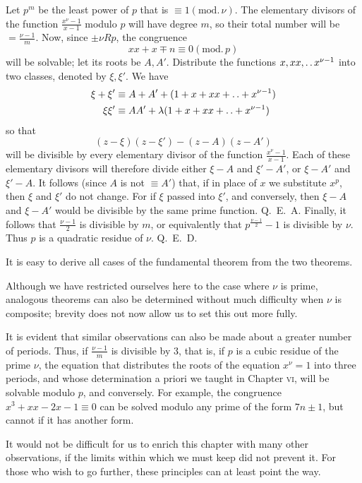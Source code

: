 Let $p^m$ be the least power of $p$ that is $\equiv1(\mathrm{mod.}\,\nu)$. The elementary divisors of the function $\frac{x^\nu-1}{x-1}$ modulo $p$ will have degree $m$, so their total number will be $=\frac{\nu-1}m$. Now, since $\pm\nu Rp$, the congruence
\[
xx+x\mp n\equiv0(\mathrm{mod.}\,p)
\]
will be solvable; let its roots be $A,A'$. Distribute the functions $x,xx,\mathinner{.\,.} x^{\nu-1}$ into two classes, denoted by $\xi,\xi'$. We have
\[
\begin{aligned}
\xi+\xi'&\equiv A+A'+(1+x+xx+\mathinner{.\,.}+x^{\nu-1})\\
\xi\xi'&\equiv AA'+\lambda(1+x+xx+\mathinner{.\,.}+x^{\nu-1})
\end{aligned}
\]
so that
\[
(z-\xi)(z-\xi')-(z-A)(z-A')
\]
will be divisible by every elementary divisor of the function $\frac{x^\nu-1}{x-1}$. Each of these elementary divisors will therefore divide either $\xi-A$ and $\xi'-A'$, or $\xi-A'$ and $\xi'-A$. It follows (since $A$ is not $\equiv A'$) that, if in place of $x$ we substitute $x^p$, then $\xi$ and $\xi'$ do not change. For if $\xi$ passed into $\xi'$, and conversely, then $\xi-A$ and $\xi-A'$ would be divisible by the same prime function. Q.\ E.\ A. Finally, it follows that $\frac{\nu-1}2$ is divisible by $m$, or equivalently that $p^{\frac{\nu-1}2}-1$ is divisible by $\nu$. Thus $p$ is a quadratic residue of $\nu$. Q.\ E.\ D.

It is easy to derive all cases of the fundamental theorem from the two theorems.

Although we have restricted ourselves here to the case where $\nu$ is prime, analogous theorems can also be determined without much difficulty when $\nu$ is composite; brevity does not now allow us to set this out more fully.

It is evident that similar observations can also be made about a greater number of periods. Thus, if $\frac{\nu-1}m$ is divisible by $3$, that is, if $p$ is a cubic residue of the prime $\nu$, the equation that distributes the roots of the equation $x^\nu=1$ into three periods, and whose determination a priori we taught in Chapter \textsc{vi}, will be solvable modulo $p$, and conversely. For example, the congruence $x^3+xx-2x-1\equiv0$ can be solved modulo any prime of the form $7n\pm1$, but cannot if it has another form.

It would not be difficult for us to enrich this chapter with many other observations, if the limits within which we must keep did not prevent it. For those who wish to go further, these principles can at least point the way.
